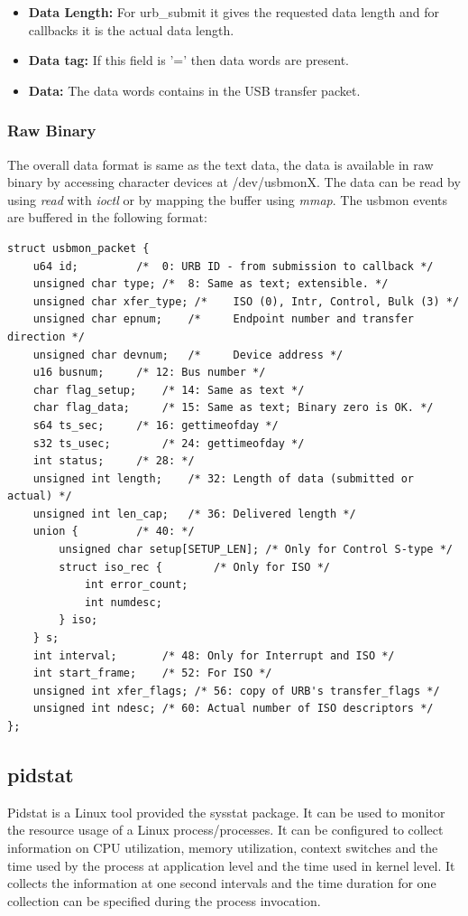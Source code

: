 \begin{itemize}
\item{\textbf{Data Length:} For urb\_submit it gives the requested data length and for callbacks it is the actual data length.}

\item{\textbf{Data tag:} If this field is '=' then data words are present.}

\item{\textbf{Data:} The data words contains in the USB transfer packet.}
\end{itemize}

\subsubsection{Raw Binary}
The overall data format is same as the text data, the data is available in raw binary by accessing character devices at /dev/usbmonX. The data can be read by using \textit{read} with \textit{ioctl} or by mapping the buffer using \textit{mmap}. The usbmon events are buffered in the following format:

\begingroup
\centering\scriptsize\begin{lstlisting}
struct usbmon_packet {
	u64 id;			/*  0: URB ID - from submission to callback */
	unsigned char type;	/*  8: Same as text; extensible. */
	unsigned char xfer_type; /*    ISO (0), Intr, Control, Bulk (3) */
	unsigned char epnum;	/*     Endpoint number and transfer direction */
	unsigned char devnum;	/*     Device address */
	u16 busnum;		/* 12: Bus number */
	char flag_setup;	/* 14: Same as text */
	char flag_data;		/* 15: Same as text; Binary zero is OK. */
	s64 ts_sec;		/* 16: gettimeofday */
	s32 ts_usec;		/* 24: gettimeofday */
	int status;		/* 28: */
	unsigned int length;	/* 32: Length of data (submitted or actual) */
	unsigned int len_cap;	/* 36: Delivered length */
	union {			/* 40: */
		unsigned char setup[SETUP_LEN];	/* Only for Control S-type */
		struct iso_rec {		/* Only for ISO */
			int error_count;
			int numdesc;
		} iso;
	} s;
	int interval;		/* 48: Only for Interrupt and ISO */
	int start_frame;	/* 52: For ISO */
	unsigned int xfer_flags; /* 56: copy of URB's transfer_flags */
	unsigned int ndesc;	/* 60: Actual number of ISO descriptors */
};	
\end{lstlisting}
\endgroup


\subsection{pidstat}
Pidstat is a Linux tool provided the sysstat package.
It can be used to monitor the resource usage of a Linux process/processes.
It can be configured to collect information on CPU utilization, memory utilization, context switches and the time  used by the process at application level and the time used in kernel level.
It collects the information at one second intervals and the time duration for one collection can be specified during the process invocation.

